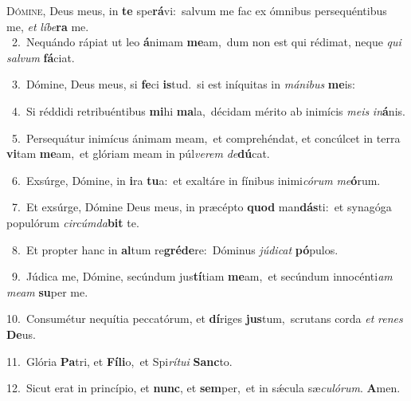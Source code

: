 \lettrine{\initial\textcolor{\initialcolor}{D}}{ómine,} Deus meus, in \textbf{te} spe\-\textbf{rá}\-vi:~\star salvum me fac ex ómnibus persequéntibus me, \textit{et} \textit{lí}\-\textit{be}\textbf{ra} me.\\
{\numbfont\textcolor{\numbcolor}{~2.}}~Nequándo rápiat ut leo \textbf{á}\-nimam \textbf{me}\-am,~\star dum non est qui rédimat, neque \textit{qui} \textit{sal}\-\textit{vum} \textbf{fá}\-ciat.\par
{\numbfont\textcolor{\numbcolor}{~3.}}~Dómine, Deus meus, si \textbf{fe}\-ci \textbf{is}\-tud.~\star si est iníquitas in \textit{má}\-\textit{ni}\textit{bus} \textbf{me}\-is:\par
{\numbfont\textcolor{\numbcolor}{~4.}}~Si réddidi retribuéntibus \textbf{mi}\-hi \textbf{ma}\-la,~\star décidam mérito ab inimícis \textit{me}\-\textit{is} \textit{in}\-\textbf{á}nis.\par
{\numbfont\textcolor{\numbcolor}{~5.}}~Persequátur inimícus ánimam meam,~\dagger et comprehéndat, et concúlcet in terra \textbf{vi}\-tam \textbf{me}\-am,~\star et glóriam meam in púl\-\textit{ve}\-\textit{rem} \textit{de}\-\textbf{dú}cat.\par
{\numbfont\textcolor{\numbcolor}{~6.}}~Exsúrge, Dómine, in \textbf{i}\-ra \textbf{tu}\-a:~\star et exaltáre in fínibus inimi\-\textit{có}\-\textit{rum} \textit{me}\-\textbf{ó}rum.\par
{\numbfont\textcolor{\numbcolor}{~7.}}~Et exsúrge, Dómine Deus meus, in præcépto \textbf{quod} man\-\textbf{dás}\-ti:~\star et synagóga populórum \textit{cir}\-\textit{cúm}\textit{da}\textbf{bit} te.\par
{\numbfont\textcolor{\numbcolor}{~8.}}~Et propter hanc in \textbf{al}\-tum re\-\textbf{gré}\-\textbf{de}re:~\star Dóminus \textit{jú}\-\textit{di}\textit{cat} \textbf{pó}\-pulos.\par
{\numbfont\textcolor{\numbcolor}{~9.}}~Júdica me, Dómine, secúndum jus\-\textbf{tí}\-tiam \textbf{me}\-am,~\star et secúndum innocénti\textit{am} \textit{me}\-\textit{am} \textbf{su}\-per me.\par
{\numbfont\textcolor{\numbcolor}{10.}}~Consumétur nequítia peccatórum, et \textbf{dí}\-riges \textbf{jus}\-tum,~\star scrutans corda \textit{et} \textit{re}\-\textit{nes} \textbf{De}\-us.\par
{\numbfont\textcolor{\numbcolor}{11.}}~Glória \textbf{Pa}\-tri, et \textbf{Fí}\-\textbf{li}o,~\star et Spi\-\textit{rí}\-\textit{tu}\textit{i} \textbf{Sanc}\-to.\par
{\numbfont\textcolor{\numbcolor}{12.}}~Sicut erat in princípio, et \textbf{nunc}\-, et \textbf{sem}\-per,~\star et in sǽcula sæ\-\textit{cu}\-\textit{ló}\textit{rum}. \textbf{A}\-men.\par
